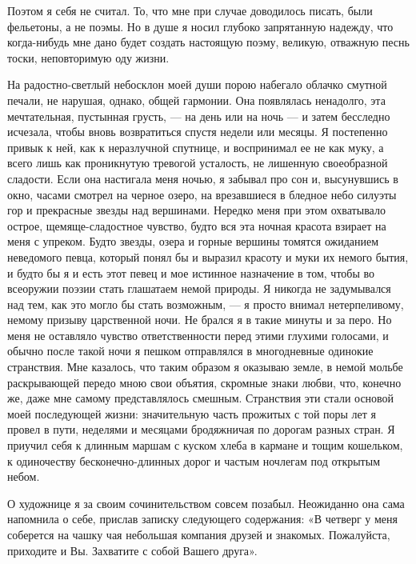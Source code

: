 Поэтом я  себя не считал.  То, что  мне при случае  доводилось писать,
были фельетоны,  а не  поэмы. Но  в душе  я носил  глубоко запрятанную
надежду,  что когда-нибудь  мне  дано будет  создать настоящую  поэму,
великую, отважную песнь тоски, неповторимую оду жизни.

На радостно-светлый небосклон моей души порою набегало облачко смутной
печали, не нарушая, однако,  общей гармонии. Она появлялась ненадолго,
эта мечтательная,  пустынная грусть,  --- на  день или  на ночь  --- и
затем бесследно  исчезала, чтобы вновь возвратиться  спустя недели или
месяцы.  Я постепенно  привык к  ней,  как к  неразлучной спутнице,  и
воспринимал  ее не  как муку,  а всего  лишь как  проникнутую тревогой
усталость, не лишенную своеобразной  сладости. Если она настигала меня
ночью, я  забывал про  сон и,  высунувшись в  окно, часами  смотрел на
черное озеро, на  врезавшиеся в бледное небо силуэты  гор и прекрасные
звезды  над  вершинами.  Нередко  меня  при  этом  охватывало  острое,
щемяще-сладостное  чувство, будто  вся эта  ночная красота  взирает на
меня с упреком. Будто звезды, озера и горные вершины томятся ожиданием
неведомого певца, который понял бы и  выразил красоту и муки их немого
бытия, и будто бы я и есть этот певец и мое истинное назначение в том,
чтобы во всеоружии поэзии стать  глашатаем немой природы. Я никогда не
задумывался над  тем, как это могло  бы стать возможным, ---  я просто
внимал нетерпеливому, немому  призыву царственной ночи. Не  брался я в
такие минуты и  за перо. Но меня не  оставляло чувство ответственности
перед  этими глухими  голосами, и  обычно  после такой  ночи я  пешком
отправлялся  в многодневные  одинокие  странствия.  Мне казалось,  что
таким образом  я оказываю  земле, в  немой мольбе  раскрывающей передо
мною свои  объятия, скромные  знаки любви, что,  конечно же,  даже мне
самому  представлялось  смешным.  Странствия эти  стали  основой  моей
последующей жизни: значительную часть прожитых с той поры лет я провел
в пути,  неделями и  месяцами бродяжничая по  дорогам разных  стран. Я
приучил  себя к  длинным  маршам  с куском  хлеба  в  кармане и  тощим
кошельком, к  одиночеству бесконечно-длинных  дорог и  частым ночлегам
под открытым небом.

О художнице я за своим  сочинительством совсем позабыл. Неожиданно она
сама  напомнила  о себе,  прислав  записку  следующего содержания:  «В
четверг  у меня  соберется на  чашку чая  небольшая компания  друзей и
знакомых. Пожалуйста, приходите и Вы. Захватите с собой Вашего друга».

